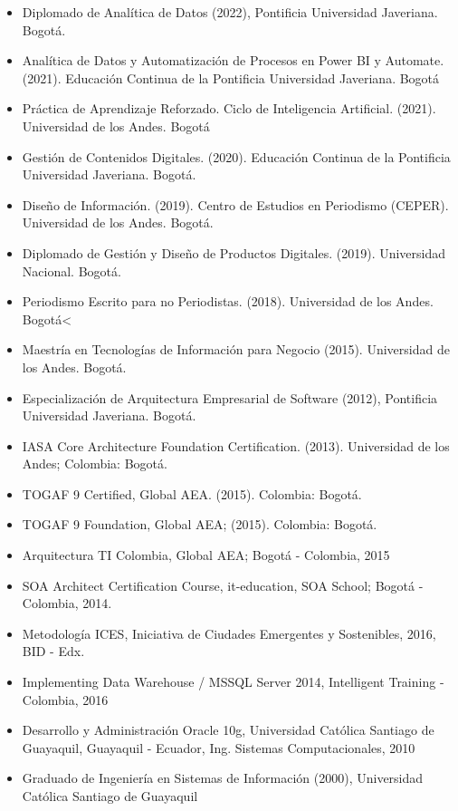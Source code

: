 \documentclass{tufte-handout}
\def\tightlist{}
\begin{document}
\begin{itemize}
\tightlist
\item
  Diplomado de Analítica de Datos (2022), Pontificia Universidad
  Javeriana. Bogotá.
\item
  Analítica de Datos y Automatización de Procesos en Power BI y
  Automate. (2021). Educación Continua de la Pontificia Universidad
  Javeriana. Bogotá
\item
  Práctica de Aprendizaje Reforzado. Ciclo de Inteligencia Artificial.
  (2021). Universidad de los Andes. Bogotá
\item
  Gestión de Contenidos Digitales. (2020). Educación Continua de la
  Pontificia Universidad Javeriana. Bogotá.
\item
  Diseño de Información. (2019). Centro de Estudios en Periodismo
  (CEPER). Universidad de los Andes. Bogotá.
\item
  Diplomado de Gestión y Diseño de Productos Digitales. (2019).
  Universidad Nacional. Bogotá.
\item
  Periodismo Escrito para no Periodistas. (2018). Universidad de los
  Andes. Bogotá\textless{}
\item
  Maestría en Tecnologías de Información para Negocio (2015).
  Universidad de los Andes. Bogotá.
\item
  Especialización de Arquitectura Empresarial de Software (2012),
  Pontificia Universidad Javeriana. Bogotá.
\item
  IASA Core Architecture Foundation Certification. (2013). Universidad
  de los Andes; Colombia: Bogotá.
\item
  TOGAF 9 Certified, Global AEA. (2015). Colombia: Bogotá.
\item
  TOGAF 9 Foundation, Global AEA; (2015). Colombia: Bogotá.
\item
  Arquitectura TI Colombia, Global AEA; Bogotá - Colombia, 2015
\item
  SOA Architect Certification Course, it-education, SOA School; Bogotá -
  Colombia, 2014.
\item
  Metodología ICES, Iniciativa de Ciudades Emergentes y Sostenibles,
  2016, BID - Edx.
\item
  Implementing Data Warehouse / MSSQL Server 2014, Intelligent Training
  - Colombia, 2016
\item
  Desarrollo y Administración Oracle 10g, Universidad Católica Santiago
  de Guayaquil, Guayaquil - Ecuador, Ing. Sistemas Computacionales, 2010
\item
  Graduado de Ingeniería en Sistemas de Información (2000), Universidad
  Católica Santiago de Guayaquil
\end{itemize}
\end{document}
